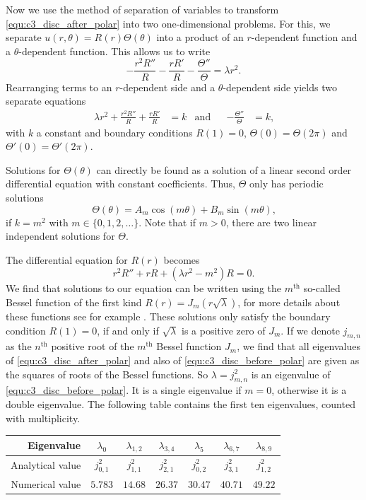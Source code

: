 Now we use the method of separation of variables to transform \eqref{equ:c3_disc_after_polar} into two one-dimensional problems. For this, we separate $u(r, \theta) = R(r) \Theta(\theta)$ into a product of an $r$-dependent function and a $\theta$-dependent function. This allows us to write
$$
  -\frac{r^2 R''}{R} - \frac{rR'}{R} - \frac{\Theta''}{\Theta} = \lambda r^2 \text{.}
$$
Rearranging terms to an $r$-dependent side and a $\theta$-dependent side yields two separate equations
\begin{align*}
  \lambda r^2 + \frac{r^2 R''}{R} + \frac{rR'}{R} & = k & \text{and} &  & -\frac{\Theta''}{\Theta} & = k\text{,}
\end{align*}
with $k$ a constant and boundary conditions $R(1) = 0$, $\Theta(0) = \Theta(2\pi)$ and $\Theta'(0) = \Theta'(2\pi)$.

Solutions for $\Theta(\theta)$ can directly be found as a solution of a linear second order differential equation with constant coefficients. Thus, $\Theta$ only has periodic solutions
$$
  \Theta(\theta) = A_m \cos(m\theta) + B_m \sin(m\theta)\text{,}
$$
if $k = m^2$ with $m \in \{0, 1, 2, \dots\}$. Note that if $m > 0$, there are two linear independent solutions for $\Theta$.

The differential equation for $R(r)$ becomes
$$
  r^2 R'' + r R + (\lambda r^2 - m^2)R = 0\text{.}
$$
We find that solutions to our equation can be written using the $m^\text{th}$ so-called Bessel function of the first kind $R(r) = J_m(r \sqrt{\lambda})$, for more details about these functions see for example \cite[section~4.7]{asmar_partial_2005}. These solutions only satisfy the boundary condition $R(1) = 0$, if and only if $\sqrt{\lambda}$ is a positive zero of $J_m$. If we denote $j_{m, n}$ as the $n^\text{th}$ positive root of the $m^\text{th}$ Bessel function $J_m$, we find that all eigenvalues of \eqref{equ:c3_disc_after_polar} and also of \eqref{equ:c3_disc_before_polar} are given as the squares of roots of the Bessel functions. So $\lambda = j_{m, n}^2$ is an eigenvalue of \eqref{equ:c3_disc_before_polar}. It is a single eigenvalue if $m = 0$, otherwise it is a double eigenvalue. The following table contains the first ten eigenvalues, counted with multiplicity.

\begin{center}
  \bgroup
  \def\arraystretch{1.5}
  \begin{tabular}{r|cccccc}
    Eigenvalue       & $\lambda_0$ & $\lambda_{1,2}$ & $\lambda_{3,4}$ & $\lambda_{5}$ & $\lambda_{6,7}$ & $\lambda_{8,9}$ \\ \hline\hline
    Analytical value & $j_{0,1}^2$ & $j_{1,1}^2$     & $j_{2,1}^2$     & $j_{0,2}^2$   & $j_{3,1}^2$     & $j_{1,2}^2$     \\ \hline
    Numerical value  & $5.783$     & $14.68$         & $26.37$         & $30.47$       & $40.71$         & $49.22$
  \end{tabular}
  \egroup
\end{center}


